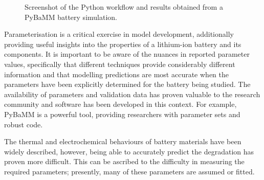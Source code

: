 \documentclass[journal=jacsat,manuscript=article]{achemso}
\begin{document}
\begin{figure}[h]
    \centering
    \caption{\label{fig:pybamm} Screenshot of the Python workflow and results obtained from a PyBaMM battery simulation.} 
\end{figure}

Parameterisation is a critical exercise in model development, additionally providing useful insights into the properties of a lithium-ion battery and its components. 
It is important to be aware of the nuances in reported parameter values, specifically that different techniques provide considerably different information and that modelling predictions are most accurate when the parameters have been explicitly determined for the battery being studied. 
The availability of parameters and validation data has proven valuable to the research community and software has been developed in this context. 
For example, PyBaMM is a powerful tool, providing researchers with parameter sets and robust code.

The thermal and electrochemical behaviours of battery materials have been widely described, however, being able to accurately predict the degradation has proven more difficult. 
This can be ascribed to the difficulty in measuring the required parameters; presently, many of these parameters are assumed or fitted. 
\end{document}
